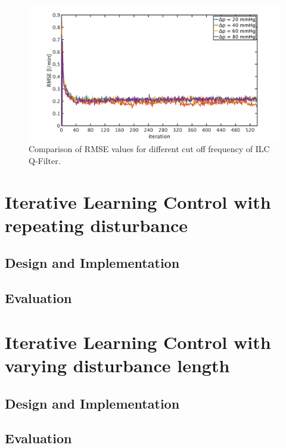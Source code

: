 \begin{figure}[ht]
  \centering
  \includegraphics[width=\textwidth]{images/chapt_5/ILC/RMSE_compare_operating_points.pdf}
  \caption[Comparison of RMSE values for different cut off frequency of ILC Q-Filter]{Comparison of RMSE values for different cut off frequency of ILC Q-Filter.}
  \label{fig:RMSE_compare_operating_points}
\end{figure}
\section{Iterative Learning Control with repeating disturbance}
\subsection{Design and Implementation}

\subsection{Evaluation}
\section{Iterative Learning Control with varying disturbance length}
\subsection{Design and Implementation}
\subsection{Evaluation}



